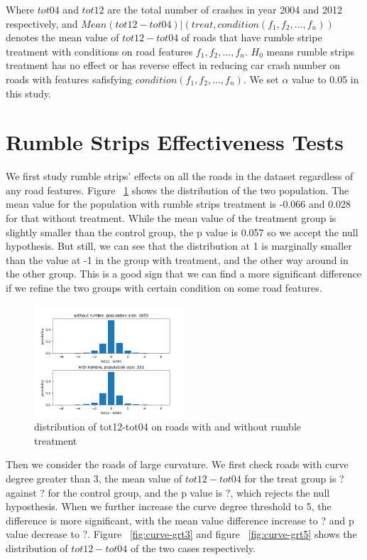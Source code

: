 \documentclass{article}
\begin{document}
Where $tot04$ and $tot12$ are the total number of crashes in year 2004 and 2012 respectively, and $Mean(tot12-tot04)|(treat, condition(f_1, f_2, ..., f_n))$ denotes the mean value of $tot12-tot04$ of roads that have rumble stripe treatment with conditions on road features $f_1, f_2, ..., f_n$. $H_0$ means rumble strips treatment has no effect or has reverse effect in reducing car crash number on roads with features safisfying $condition(f_1, f_2, ..., f_n)$. We set $\alpha$ value to 0.05 in this study.

\section*{Rumble Strips Effectiveness Tests}

We first study rumble strips' effects on all the roads in the dataset regardless of any road features. Figure ~\ref{fig:general-effect} shows the distribution of the two population. The mean value for the population with rumble strips treatment is -0.066 and 0.028 for that without treatment. While the mean value of the treatment group is slightly smaller than the control group, the p value is 0.057 so we accept the null hypothesis. But still, we can see that the distribution at 1 is marginally smaller than the value at -1 in the group with treatment, and the other way around in the other group. This is a good sign that we can find a more significant difference if we refine the two groups with certain condition on some road features.

\begin{figure}[h!]
    \centering
    \includegraphics[width=0.5\textwidth]{with-and-without-rumble-diff.png}
    \caption{distribution of tot12-tot04 on roads with and without rumble treatment}
    \label{fig:general-effect}
\end{figure}

Then we consider the roads of large curvature. We first check roads with curve degree greater than 3, the mean value of $tot12-tot04$ for the treat group is ? against ? for the control group, and the p value is ?, which rejects the null hyposthesis. When we further increase the curve degree threshold to 5, the difference is more significant, with the mean value difference increase to ? and p value decrease to ?. Figure ~\ref{fig:curve-grt3} and figure ~\ref{fig:curve-grt5} shows the distribution of $tot12-tot04$ of the two cases respectively. 
\end{document}
